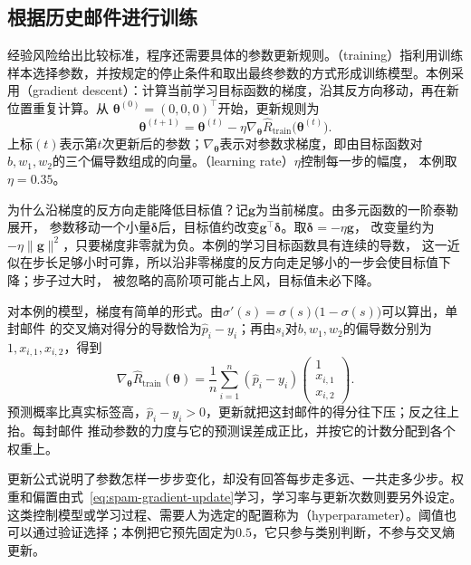 \subsection{根据历史邮件进行训练}

经验风险给出比较标准，程序还需要具体的参数更新规则。（training）指利用训练样本选择参数，并按规定的停止条件和取出最终参数的方式形成训练模型。本例采用（gradient descent）：计算当前学习目标函数的梯度，沿其反方向移动，再在新位置重复计算。从
$\bm{\theta}^{(0)}=(0,0,0)^{\top}$开始，更新规则为
\begin{equation}
  \bm{\theta}^{(t+1)}
  =\bm{\theta}^{(t)}-\eta\nabla_{\bm{\theta}}
  \hat{R}_{\mathrm{train}}\bigl(\bm{\theta}^{(t)}\bigr).
  \label{eq:spam-gradient-update}
\end{equation}
上标$(t)$表示第$t$次更新后的参数；$\nabla_{\bm{\theta}}$表示对参数求梯度，即由目标函数对
$b,w_1,w_2$的三个偏导数组成的向量。（learning rate）$\eta$控制每一步的幅度，
本例取$\eta=0.35$。

为什么沿梯度的反方向走能降低目标值？记$\bm{g}$为当前梯度。由多元函数的一阶泰勒展开，
参数移动一个小量$\bm{\delta}$后，目标值约改变$\bm{g}^{\top}\bm{\delta}$。取$\bm{\delta}=-\eta\bm{g}$，
改变量约为$-\eta\lVert\bm{g}\rVert^2$，只要梯度非零就为负。本例的学习目标函数具有连续的导数，
这一近似在步长足够小时可靠，所以沿非零梯度的反方向走足够小的一步会使目标值下降；步子过大时，
被忽略的高阶项可能占上风，目标值未必下降。

对本例的模型，梯度有简单的形式。由$\sigma'(s)=\sigma(s)\bigl(1-\sigma(s)\bigr)$可以算出，单封邮件
的交叉熵对得分的导数恰为$\hat{p}_i-y_i$；再由$s_i$对$b,w_1,w_2$的偏导数分别为$1,x_{i,1},x_{i,2}$，得到
\begin{equation}
  \nabla_{\bm{\theta}}\hat{R}_{\mathrm{train}}(\bm{\theta})
  =\frac{1}{n}\sum_{i=1}^{n}(\hat{p}_i-y_i)
  \begin{pmatrix}1\\x_{i,1}\\x_{i,2}\end{pmatrix}.
  \label{eq:spam-gradient}
\end{equation}
预测概率比真实标签高，$\hat{p}_i-y_i>0$，更新就把这封邮件的得分往下压；反之往上抬。每封邮件
推动参数的力度与它的预测误差成正比，并按它的计数分配到各个权重上。

更新公式说明了参数怎样一步步变化，却没有回答每步走多远、一共走多少步。权重和偏置由式~\eqref{eq:spam-gradient-update}学习，学习率与更新次数则要另外设定。这类控制模型或学习过程、需要人为选定的配置称为（hyperparameter）。阈值也可以通过验证选择；本例把它预先固定为$0.5$，它只参与类别判断，不参与交叉熵更新。

